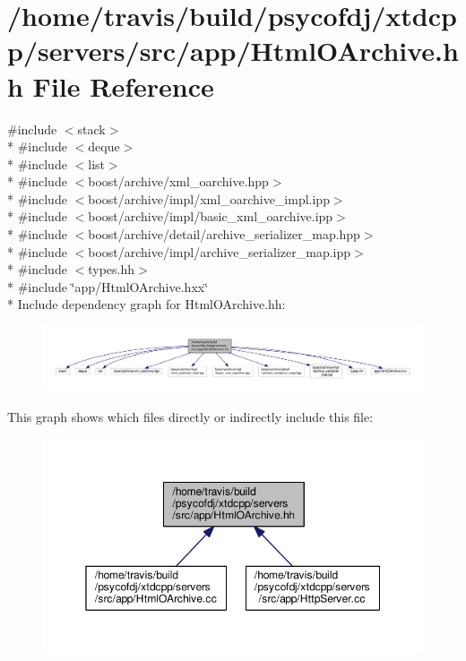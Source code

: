 \hypertarget{HtmlOArchive_8hh}{\section{/home/travis/build/psycofdj/xtdcpp/servers/src/app/\-Html\-O\-Archive.hh File Reference}
\label{HtmlOArchive_8hh}
}
{\ttfamily \#include $<$stack$>$}\\*
{\ttfamily \#include $<$deque$>$}\\*
{\ttfamily \#include $<$list$>$}\\*
{\ttfamily \#include $<$boost/archive/xml\-\_\-oarchive.\-hpp$>$}\\*
{\ttfamily \#include $<$boost/archive/impl/xml\-\_\-oarchive\-\_\-impl.\-ipp$>$}\\*
{\ttfamily \#include $<$boost/archive/impl/basic\-\_\-xml\-\_\-oarchive.\-ipp$>$}\\*
{\ttfamily \#include $<$boost/archive/detail/archive\-\_\-serializer\-\_\-map.\-hpp$>$}\\*
{\ttfamily \#include $<$boost/archive/impl/archive\-\_\-serializer\-\_\-map.\-ipp$>$}\\*
{\ttfamily \#include $<$types.\-hh$>$}\\*
{\ttfamily \#include \char`\"{}app/\-Html\-O\-Archive.\-hxx\char`\"{}}\\*
Include dependency graph for Html\-O\-Archive.\-hh\-:
\nopagebreak
\begin{figure}[H]
\begin{center}
\leavevmode
\includegraphics[width=350pt]{HtmlOArchive_8hh__incl}
\end{center}
\end{figure}
This graph shows which files directly or indirectly include this file\-:
\nopagebreak
\begin{figure}[H]
\begin{center}
\leavevmode
\includegraphics[width=350pt]{HtmlOArchive_8hh__dep__incl}
\end{center}
\end{figure}
